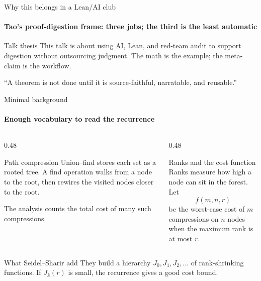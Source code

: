 \documentclass[aspectratio=169,11pt]{beamer}
\begin{document}
\begin{frame}{Why this belongs in a Lean/AI club}
\framesubtitle{Tao's proof-digestion frame: three jobs; the third is the least automatic}
\begin{center}
\end{center}
\vspace{0.3cm}
\begin{block}{Talk thesis}
This talk is about using AI, Lean, and red-team audit to support digestion without outsourcing judgment. The math is the example; the meta-claim is the workflow.
\end{block}
\vspace{0.2cm}
\begin{center}
\Large ``A theorem is not done until it is source-faithful, narratable, and reusable.''
\end{center}
\end{frame}

\begin{frame}{Minimal background}
\framesubtitle{Enough vocabulary to read the recurrence}
\begin{columns}[T,totalwidth=\textwidth]
\begin{column}{0.48\textwidth}
\begin{block}{Path compression}
Union--find stores each set as a rooted tree. A find operation walks from a node to the root, then rewires the visited nodes closer to the root.
\medskip

The analysis counts the total cost of many such compressions.
\end{block}
\end{column}
\begin{column}{0.48\textwidth}
\begin{block}{Ranks and the cost function}
Ranks measure how high a node can sit in the forest. Let
\[
  f(m,n,r)
\]
be the worst-case cost of $m$ compressions on $n$ nodes when the maximum rank is at most $r$.
\end{block}
\end{column}
\end{columns}
\vspace{0.25cm}
\begin{block}{What Seidel--Sharir add}
They build a hierarchy $J_0,J_1,J_2,\ldots$ of rank-shrinking functions. If $J_k(r)$ is small, the recurrence gives a good cost bound.
\end{block}
\end{frame}
\end{document}
